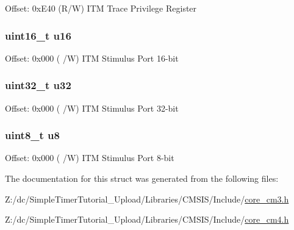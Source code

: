 Offset\-: 0x\-E40 (R/\-W) I\-T\-M Trace Privilege Register \hypertarget{struct_i_t_m___type_ae8d499140220fa6d4eab1da7262bf08e}{
\subsubsection[{u16}]{ uint16\-\_\-t u16}}\label{struct_i_t_m___type_ae8d499140220fa6d4eab1da7262bf08e}
Offset\-: 0x000 ( /\-W) I\-T\-M Stimulus Port 16-\/bit \hypertarget{struct_i_t_m___type_acaf6d0e14a3d4b541c624913b4a1931e}{
\subsubsection[{u32}]{ uint32\-\_\-t u32}}\label{struct_i_t_m___type_acaf6d0e14a3d4b541c624913b4a1931e}
Offset\-: 0x000 ( /\-W) I\-T\-M Stimulus Port 32-\/bit \hypertarget{struct_i_t_m___type_a0374c0b98ab9de6f71fabff7412df832}{
\subsubsection[{u8}]{ uint8\-\_\-t u8}}\label{struct_i_t_m___type_a0374c0b98ab9de6f71fabff7412df832}
Offset\-: 0x000 ( /\-W) I\-T\-M Stimulus Port 8-\/bit 

The documentation for this struct was generated from the following files\-:\begin{DoxyCompactItemize}
\item 
Z\-:/dc/\-Simple\-Timer\-Tutorial\-\_\-\-Upload/\-Libraries/\-C\-M\-S\-I\-S/\-Include/\hyperlink{core__cm3_8h}{core\-\_\-cm3.\-h}\item 
Z\-:/dc/\-Simple\-Timer\-Tutorial\-\_\-\-Upload/\-Libraries/\-C\-M\-S\-I\-S/\-Include/\hyperlink{core__cm4_8h}{core\-\_\-cm4.\-h}\end{DoxyCompactItemize}
